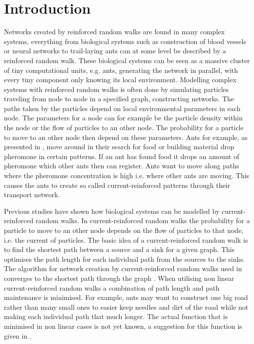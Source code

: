 \section{Introduction}
\label{sec:introduction}
Networks created by reinforced random walks are found in many complex systems, everything from biological systems such as construction of blood vessels or neural networks to trail-laying ants can at some level be described by a reinforced random walk. These biological systems can be seen as a massive cluster of tiny computational units, e.g. ants, generating the network in parallel, with every tiny component only knowing its local environment. Modelling complex systems with reinforced random walks is often done by simulating particles traveling from node to node in a specified graph, constructing networks. The paths taken by the particles depend on local environmental parameters in each node. The parameters for a node can for example be the particle density within the node or the flow of particles to an other node. The probability for a particle to move to an other node then depend on these parameters. Ants for example, as presented in \cite{Schweitzer1997153}, move around in their search for food or building material drop pheromone in certain patterns. If an ant has found food it drops an amount of pheromone which other ants then can register. Ants want to move along paths where the pheromone concentration is high i.e. where other ants are moving. This causes the ants to create so called current-reinforced patterns through their transport network.

Previous studies have shown how biological systems can be modelled by current-reinforced random walks. In current-reinforced random walks the probability for a particle to move to an other node depends on the flow of particles to that node, i.e. the current of particles. The basic idea of a current-reinforced random walk is to find the shortest path between a source and a sink for a given graph. This optimises the path length for each individual path from the sources to the sinks. The algorithm for network creation by current-reinforced random walks used in \cite{Sumpter} converges to the shortest path through the graph \cite{Ito}. When utilising non linear current-reinforced random walks a combination of path length and path maintenance is minimised. For example, ants may want to construct one big road rather than many small ones to easier keep needles and dirt of the road while not making each individual path that much longer. The actual function that is minimised in non linear cases is not yet known, a suggestion for this function is given in \cite{Sumpter}.


